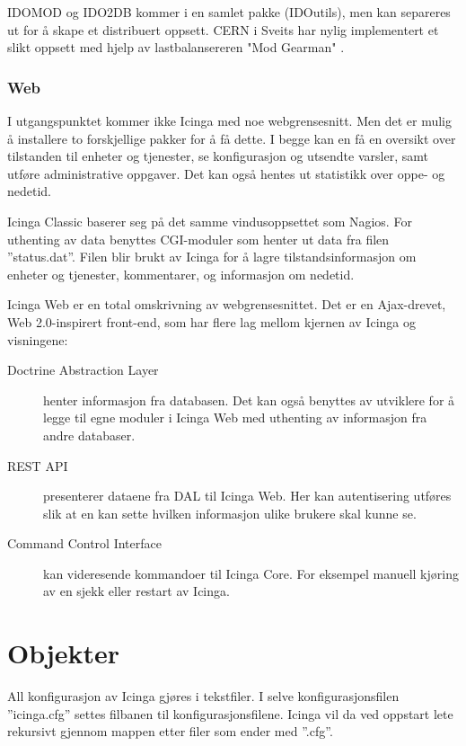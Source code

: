 IDOMOD og IDO2DB kommer i en samlet pakke (IDOutils), men kan separeres ut for å skape et distribuert oppsett. CERN i Sveits har nylig implementert et slikt oppsett med hjelp av lastbalansereren "Mod Gearman" \cite{cernthesis}.

\subsubsection{Web}\label{sec:teoriweb}
I utgangspunktet kommer ikke Icinga med noe webgrensesnitt. Men det er mulig å installere to forskjellige pakker for å få dette. I begge kan en få en oversikt over tilstanden til enheter og tjenester, se konfigurasjon og utsendte varsler, samt utføre administrative oppgaver. Det kan også hentes ut statistikk over oppe- og nedetid.

Icinga Classic baserer seg på det samme vindusoppsettet som Nagios. For uthenting av data benyttes CGI-moduler som henter ut data fra filen ''status.dat''. Filen blir brukt av Icinga for å lagre tilstandsinformasjon om enheter og tjenester, kommentarer, og informasjon om nedetid. 

Icinga Web er en total omskrivning av webgrensesnittet. Det er en Ajax-drevet, Web 2.0-inspirert front-end, som har flere lag mellom kjernen av Icinga og visningene:

\begin{description}
	\item [Doctrine Abstraction Layer] henter informasjon fra databasen. Det kan også benyttes av utviklere for å legge til egne moduler i Icinga Web med uthenting av informasjon fra andre databaser.
	\item [REST API] presenterer dataene fra DAL til Icinga Web. Her kan autentisering utføres slik at en kan sette hvilken informasjon ulike brukere skal kunne se.
	\item [Command Control Interface] kan videresende kommandoer til Icinga Core. For eksempel manuell kjøring av en sjekk eller restart av Icinga. 
\end{description}

\section{Objekter}\label{sec:objekter}
All konfigurasjon av Icinga gjøres i tekstfiler. I selve konfigurasjonsfilen ''icinga.cfg'' settes filbanen til konfigurasjonsfilene. Icinga vil da ved oppstart lete rekursivt gjennom mappen etter filer som ender med ''.cfg''.

